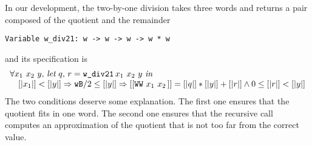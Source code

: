 In our development, the two-by-one division takes
three words and returns a pair composed of the quotient and the remainder
\begin{verbatim}
Variable w_div21: w -> w -> w -> w * w
\end{verbatim}
and its specification is 
$$\begin{array}{l}
\forall x_1\,\, x_2\,\, y,\, \textit{let}\,\, q,\, r = \texttt{w\_div21}\, x_1\,\, x_2\,\, y\,\, \textit{in}\,\, \\
\hskip10pt [|x_1|] < [|y|] \Rightarrow {\texttt{wB}} / 2 \le [|y|] \Rightarrow  [[\texttt{WW}\,\,x_1\,\,x_2\,]] = [|q|] * [|y|] + [|r|] \land 0 \le [|r|] < [|y|]
\end{array}
$$
The two conditions deserve some explanation.
The first one ensures that the quotient fits in one word.
The second one %
ensures that the recursive call computes an approximation 
of the quotient that is not too far from the correct value.

